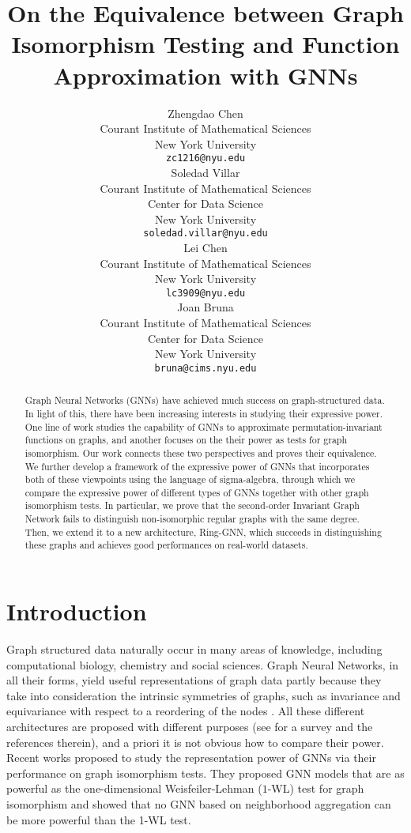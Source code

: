 \documentclass{article}
\title{On the Equivalence between Graph Isomorphism Testing and Function Approximation with GNNs}
\author{Zhengdao Chen \\
  Courant Institute of Mathematical Sciences\\
  New York University\\
  \texttt{zc1216@nyu.edu} \\
\And
     Soledad Villar \\
  Courant Institute of Mathematical Sciences\\
  Center for Data Science \\
  New York University\\
  \texttt{soledad.villar@nyu.edu} \\ 
   \AND
     Lei Chen \\
  Courant Institute of Mathematical Sciences\\
  New York University\\
  \texttt{lc3909@nyu.edu} \\
   \And
    Joan Bruna \\
  Courant Institute of Mathematical Sciences\\
  Center for Data Science \\
  New York University\\
  \texttt{bruna@cims.nyu.edu} \\ 
}
\begin{document}
\maketitle


\begin{abstract}
Graph Neural Networks (GNNs) have achieved much success on graph-structured data. In light of this, there have been increasing interests in studying their expressive power. One line of work studies the capability of GNNs to approximate permutation-invariant functions on graphs, and another focuses on the their power as tests for graph isomorphism. Our work connects these two perspectives and proves their equivalence. We further develop a framework of the expressive power of GNNs that incorporates both of these viewpoints using the language of sigma-algebra, through which we compare the expressive power of different types of GNNs together with other graph isomorphism tests. In particular, we prove that the second-order Invariant Graph Network fails to distinguish non-isomorphic regular graphs with the same degree. Then, we extend it to a new architecture, Ring-GNN, which succeeds in distinguishing these graphs and achieves good performances on real-world datasets.
\end{abstract}


\section{Introduction}
Graph structured data naturally occur in many areas of knowledge, including computational biology, chemistry and social sciences. Graph Neural Networks, in all their forms, yield useful representations of graph data partly because they take into consideration the intrinsic symmetries of graphs, such as invariance and equivariance with respect to a reordering of the nodes \cite{scarselli2008graph, duvenaud2015convolutional, kipf2016semi, gilmer2017neural, hamilton2017inductive, velickovic2017graph, bronstein2017geometric, you2019pgnn}.
All these different architectures are proposed with different purposes (see \cite{wu2019comprehensive} for a survey and the references therein), and a priori it is not obvious how to compare their power. Recent works \cite{xu2018powerful, morris2019higher} proposed to study the representation power of GNNs via their performance on graph isomorphism tests. They proposed GNN models that are as powerful as the one-dimensional Weisfeiler-Lehman ($1$-WL) test for graph isomorphism \cite{weisfeiler1968reduction} and showed that no GNN based on neighborhood aggregation can be more powerful than the 1-WL test. 
\end{document}
